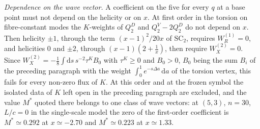 \emph{Dependence on the wave vector.} A coefficient on the five for every \(q\) at a base point must not depend on the helicity or on \(x\). At first order in the torsion on fibre-constant modes the \(K\)-weights of \(Q_2^D\) and \(Q_2^V-2Q_2^D\) do not depend on \(x\). Then helicity \(\pm1\), through the term \((x-1)^2/20x\) of \(\mathrm{SC}_2\), requires \(W_R^{(1)}=0\), and helicities \(0\) and \(\pm2\), through \((x-1)(2+\tfrac1x)\), then require \(W_X^{(2)}=0\). Since \(W_X^{(2)}=-\tfrac18\int\mathrm ds\,s^{-2}\tau^KB_0\) with \(\tau^K\ge0\) and \(B_0>0\), \(B_0\) being the sum \(B_i\) of the preceding paragraph with the weight \(\int_0^1e^{-s\Delta a}\,\mathrm da\) of the torsion vertex, this fails for every non-zero flux of \(K\). At this order and at the frozen symbol the isolated data of \(K\) left open in the preceding paragraph are excluded, and the value \(M^*\) quoted there belongs to one class of wave vectors: at \((5,3)\), \(n=30\), \(L/c=0\) in the single-scale model the zero of the first-order coefficient is \(M^*\simeq0.292\) at \(x\simeq-2.70\) and \(M^*\simeq0.223\) at \(x\simeq1.33\).

